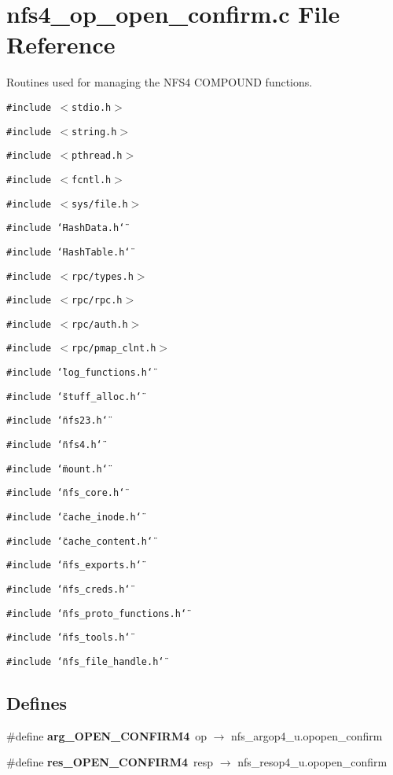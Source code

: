 \section{nfs4\_\-op\_\-open\_\-confirm.c File Reference}
\label{nfs4__op__open__confirm_8c}
Routines used for managing the NFS4 COMPOUND functions. 

{\tt \#include $<$stdio.h$>$}\par
{\tt \#include $<$string.h$>$}\par
{\tt \#include $<$pthread.h$>$}\par
{\tt \#include $<$fcntl.h$>$}\par
{\tt \#include $<$sys/file.h$>$}\par
{\tt \#include \char`\"{}Hash\-Data.h\char`\"{}}\par
{\tt \#include \char`\"{}Hash\-Table.h\char`\"{}}\par
{\tt \#include $<$rpc/types.h$>$}\par
{\tt \#include $<$rpc/rpc.h$>$}\par
{\tt \#include $<$rpc/auth.h$>$}\par
{\tt \#include $<$rpc/pmap\_\-clnt.h$>$}\par
{\tt \#include \char`\"{}log\_\-functions.h\char`\"{}}\par
{\tt \#include \char`\"{}stuff\_\-alloc.h\char`\"{}}\par
{\tt \#include \char`\"{}nfs23.h\char`\"{}}\par
{\tt \#include \char`\"{}nfs4.h\char`\"{}}\par
{\tt \#include \char`\"{}mount.h\char`\"{}}\par
{\tt \#include \char`\"{}nfs\_\-core.h\char`\"{}}\par
{\tt \#include \char`\"{}cache\_\-inode.h\char`\"{}}\par
{\tt \#include \char`\"{}cache\_\-content.h\char`\"{}}\par
{\tt \#include \char`\"{}nfs\_\-exports.h\char`\"{}}\par
{\tt \#include \char`\"{}nfs\_\-creds.h\char`\"{}}\par
{\tt \#include \char`\"{}nfs\_\-proto\_\-functions.h\char`\"{}}\par
{\tt \#include \char`\"{}nfs\_\-tools.h\char`\"{}}\par
{\tt \#include \char`\"{}nfs\_\-file\_\-handle.h\char`\"{}}\par
\subsection*{Defines}
\begin{CompactItemize}
\item 
\#define {\bf arg\_\-OPEN\_\-CONFIRM4}\ op $\rightarrow$ nfs\_\-argop4\_\-u.opopen\_\-confirm
\item 
\#define {\bf res\_\-OPEN\_\-CONFIRM4}\ resp $\rightarrow$ nfs\_\-resop4\_\-u.opopen\_\-confirm
\end{CompactItemize}
